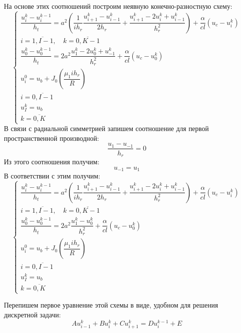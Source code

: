 \documentclass[a4paper,14pt,russian, fleqn]{extreport}
\begin{document}
	На основе этих соотношений построим неявную конечно-разностную схему:
	\begin{equation*}
		\left\{\begin{array}{l}
			\dfrac{u_i^{k}-u_i^{k-1}}{h_t} = a^2\left(\dfrac{1}{ih_r}\dfrac{u_{i+1}^k - u_{i-1}^k}{2h_r} +\dfrac{u_{i+1}^k - 2u_i^k + u_{i-1}^k}{h^2_r}\right) + \dfrac{\alpha}{cl}\left (u_c - u_i^k \right) \\
			i = \overline{1,I-1}, \quad k = \overline{0,K-1}	 \\
			\dfrac{u_0^{k}-u_0^{k-1}}{h_t} = 2a^2\dfrac{u_1^k-2u_0^k+u_{-1}^k}{h_r^2} + \dfrac{\alpha}{cl}(u_c-u_0^k) \\
			u_i^0 = u_b + J_0\left( \dfrac{\mu_1 ih_r}{R} \right) \\
			i = \overline{0, I-1} \\
			u_I^k = u_b \\
		k = \overline{0,K}
	\end{array}\right.
	\end{equation*}
	В связи с радиальной симметрией запишем соотношение для первой пространственной производной:
	\begin{equation*}
		\dfrac{u_1 - u_{-1}}{h_r} = 0
	\end{equation*}
	Из этого соотношения получим:
	\begin{equation*}
		u_{-1} = u_1
	\end{equation*}
	В соответствии с этим получим:
	\begin{equation}\label{ImplicitScheme}
		\left\{\begin{array}{l}
			\dfrac{u_i^{k}-u_i^{k-1}}{h_t} = a^2\left(\dfrac{1}{ih_r}\dfrac{u_{i+1}^k - u_{i-1}^k}{2h_r} +\dfrac{u_{i+1}^k - 2u_i^k + u_{i-1}^k}{h^2_r}\right) + \dfrac{\alpha}{cl}\left (u_c - u_i^k \right) \\
			i = \overline{1,I-1}, \quad k = \overline{0,K-1}	 \\
			\dfrac{u_0^{k}-u_0^{k-1}}{h_t} = 2a^2\dfrac{u_1^k-u_0^k}{h_r^2} + \dfrac{\alpha}{cl}(u_c-u_0^k) \\
			u_i^0 = u_b + J_0\left( \dfrac{\mu_1 ih_r}{R} \right) \\
			i = \overline{0, I-1} \\
			u_I^k = u_b \\
			k = \overline{0,K}
		\end{array}\right.
	\end{equation}
	
	Перепишем первое уравнение этой схемы в виде, удобном для решения дискретной задачи:
	\begin{equation*}
		Au^k_{i-1} + Bu^k_i + Cu^k_{i+1} = Du_i^{k-1} + E
	\end{equation*}
	
\end{document}
